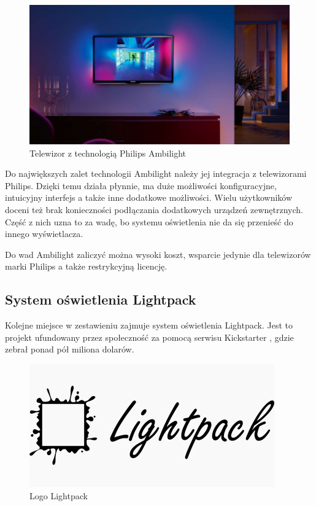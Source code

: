 \documentclass[12pt]{report}
\begin{document}
\begin{figure}[h]
\centering
\includegraphics[width=\textwidth]{../resources/ambilight2.jpg}
\caption[Telewizor z technologią Philips Ambilight]{Telewizor z technologią Philips Ambilight \cite{ambilight2}}
\end{figure}

Do największych zalet technologii Ambilight należy jej integracja z telewizorami Philips. Dzięki temu działa płynnie, ma duże możliwości konfiguracyjne, intuicyjny interfejs a także inne dodatkowe możliwości. Wielu użytkowników doceni też brak konieczności podłączania dodatkowych urządzeń zewnętrznych. Część z nich uzna to za wadę, bo systemu oświetlenia nie da się przenieść do innego wyświetlacza.

Do wad Ambilight zaliczyć można wysoki koszt, wsparcie jedynie dla telewizorów marki Philips a także restrykcyjną licencję.

\subsection{System oświetlenia Lightpack} \label{lightpack}

Kolejne miejsce w zestawieniu zajmuje system oświetlenia Lightpack. Jest to projekt ufundowany przez społeczność za pomocą serwisu Kickstarter \cite{lpk}, gdzie zebrał ponad pół miliona dolarów.

\begin{figure}[h]
\centering
\includegraphics[width=.35\textwidth]{../resources/lightpack.jpg}
\caption[Logo Lightpack]{Logo Lightpack \cite{lps}}
\end{figure}
\end{document}

